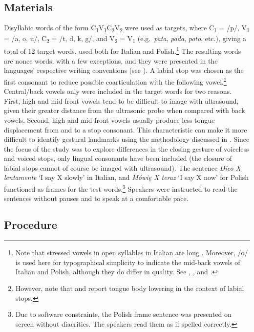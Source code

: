 \documentclass[12pt,]{article}
\let\rmarkdownfootnote\footnote%
\def\footnote{\protect\rmarkdownfootnote}
\begin{document}
\hypertarget{materials}{%
\subsection{Materials}\label{materials}}

Disyllabic words of the form
C\textsubscript{1}V\textsubscript{1}C\textsubscript{2}V\textsubscript{2}
were used as targets, where C\textsubscript{1} = /p/, V\textsubscript{1}
= /a, o, u/, C\textsubscript{2} = /t, d, k, g/, and V\textsubscript{2} =
V\textsubscript{1} (e.g.~\emph{pata}, \emph{pada}, \emph{poto}, etc.),
giving a total of 12 target words, used both for Italian and
Polish.\footnote{Note that stressed vowels in open syllables in Italian are long \citep{renwick2016}. Moreover, /o/ is used here for typographical simplicity to indicate the mid-back vowels of Italian and Polish, although they do differ in quality. See \citet{kramer2009}, \citet{renwick2016}, and \citet{gussmann2007}.}
The resulting words are nonce words, with a few exceptions, and they
were presented in the languages' respective writing conventions (see
). A labial stop was chosen as the first consonant to
reduce possible coarticulation with the following
vowel.\footnote{However, note that \citet{westbury1983} and \citet{vazquez-alvarez2007} report tongue body lowering in the context of labial stops.}
Central/back vowels only were included in the target words for two
reasons. First, high and mid front vowels tend to be difficult to image
with ultrasound, given their greater distance from the ultrasonic probe
when compared with back vowels. Second, high and mid front vowels
usually produce less tongue displacement from and to a stop consonant.
This characteristic can make it more difficult to identify gestural
landmarks using the methodology discussed in . Since the
focus of the study was to explore differences in the closing gesture of
voiceless and voiced stops, only lingual consonants have been included
(the closure of labial stops cannot of course be imaged with
ultrasound). The sentence \emph{Dico X lentamente} `I say X slowly' in
Italian, and \emph{Mówię X teraz} `I say X now' for Polish functioned as
frames for the test
words.\footnote{Due to software constraints, the Polish frame sentence was presented on screen without diacritics. The speakers read them as if spelled correctly.}
Speakers were instructed to read the sentences without pauses and to
speak at a comfortable pace.

\hypertarget{procedure}{%
\subsection{Procedure}\label{procedure}}
\end{document}
